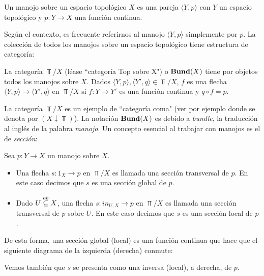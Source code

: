 \begin{Def}[Manojo]
    Un manojo sobre un espacio topológico $X$ es una pareja $\langle Y, p\rangle$ con $Y$ un espacio topológico y $p:Y\to X$ una función continua.
\end{Def}
Según el contexto, es frecuente referirnos al manojo $\langle Y,p\rangle$ simplemente por $p$. La colección de todos los manojos sobre un espacio topológico tiene estructura de categoría:
\begin{Def}
   La categoría $\Top /X$ (léase ``categoría Top sobre X") o $\normalfont{\textbf{Bund}} (X)$ tiene por objetos todos los manojos sobre $X$. Dados $\langle Y,p\rangle,\langle Y',q\rangle\in \Top/X$, $f$ es una flecha $\langle Y,p\rangle\to\langle Y',q\rangle$ en $\Top/X$ si $f:Y\to Y'$ es una función continua y $q\circ f=p$.
   
\end{Def}
La categoría $\Top /X$ es un ejemplo de ``categoría coma" (ver por ejemplo \cite[p.~45]{CWM} donde se denota por $(X \downarrow \Top)$). La notación $\normalfont{\textbf{Bund}} (X)$ es debido a \textit{bundle}, la traducción al inglés de la palabra \textit{manojo}. Un concepto esencial al trabajar con manojos es el de \textit{sección}:
\begin{Def}[Secciones]
   Sea $p:Y\to X$ un manojo sobre $X$.
   \begin{itemize}
      \item Una flecha $s:1_{X}\to p$ en $\Top/X$ es llamada una sección transversal de $p$. En este caso decimos que $s$ es una sección global de $p$.
      \item Dado $U\stackrel{ab}{\subseteq} X$, una flecha $s:in_{U,X}\to p$ en $\Top/X$ es llamada una sección transversal de $p$ sobre $U$. En este caso decimos que $s$ es una sección local de $p$.
   \end{itemize}
\end{Def}
De esta forma, una sección global (local) es una función continua que hace que el siguiente diagrama de la izquierda (derecha) conmute:

Vemos también que $s$ se presenta como una inversa (local), a derecha, de $p$.

